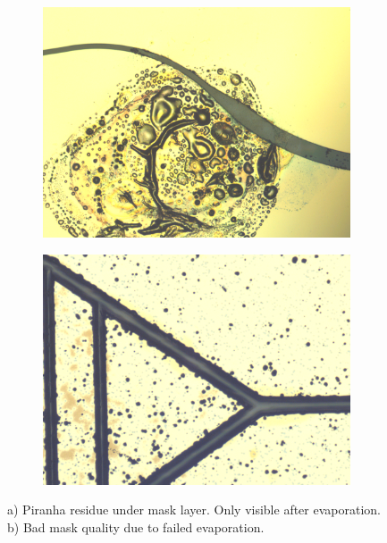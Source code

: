 \documentclass[final]{jyflluk}
\begin{document}
\begin{figure}[h]
    \centering
    \begin{subfigure}[ht]{0.48\textwidth}
        \centering
        \includegraphics[width=\linewidth]{optical/bad_piranha.png} 
        \caption{} \label{fig:piranjaaa}
    \end{subfigure}
    \hfill
    \begin{subfigure}[ht]{0.48\textwidth}
        \centering
        \includegraphics[width=\linewidth]{optical/faultyevap.png} 
        \caption{} \label{fig:faultyy}
    \end{subfigure}
    \caption{a) Piranha residue under mask layer. Only visible after evaporation. b) Bad mask quality due to failed evaporation.} \label{fig:bad_piranha}
\end{figure}  
\end{document}
